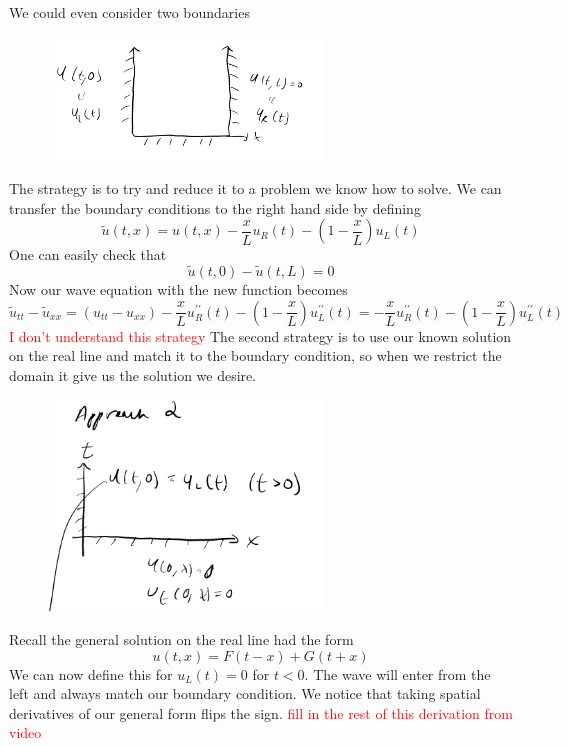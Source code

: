 \documentclass[11pt,a4paper]{article}
\begin{document}
We could even consider two boundaries
\begin{figure}[H]
	\centering
	\includegraphics[width=0.65\textwidth]{time2.png} %
\end{figure}
The strategy is to try and reduce it to a problem we know how to solve. We can transfer the boundary conditions to the right hand side by defining
$$
\tilde{u}(t,x) = u(t,x)-\frac{x}{L}u_{R}(t)-(1-\frac{x}{L})u_{L}(t)
$$
One can easily check that 
$$
\tilde{u}(t,0)-\tilde{u}(t,L)=0
$$
Now our wave equation with the new function becomes
$$
\tilde{u}_{tt}-\tilde{u}_{xx} = (u_{tt}-u_{xx})-\frac{x}{L}u^{\prime\prime}_{R}(t)-(1-\frac{x}{L})u^{\prime\prime}_{L}(t) = -\frac{x}{L}u^{\prime\prime}_{R}(t)-(1-\frac{x}{L})u^{\prime\prime}_{L}(t)
$$
\textcolor{red}{I don't understand this strategy} The second strategy is to use our known solution on the real line and match it to the boundary condition, so when we restrict the domain it give us the solution we desire.
\begin{figure}[H]
	\centering
	\includegraphics[width=0.65\textwidth]{Approach2.png} %
\end{figure}
Recall the general solution on the real line had the form
$$
u(t,x) =  F(t-x)+G(t+x)
$$
We can now define this for $u_{L}(t)=0$ for $t<0$. The wave will enter from the left and always match our boundary condition. We notice that taking spatial derivatives of our general form flips the sign. 
\textcolor{red}{fill in the rest of this derivation from video}
\end{document}
